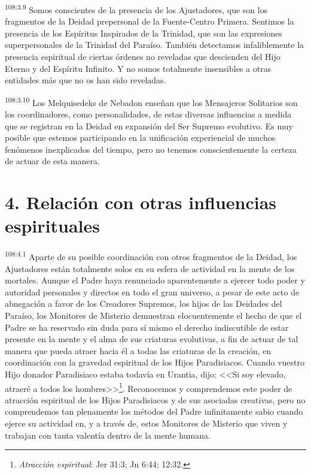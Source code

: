 \par
\textsuperscript{108:3.9} Somos conscientes de la presencia de los Ajustadores, que son los fragmentos de la Deidad prepersonal de la Fuente-Centro Primera. Sentimos la presencia de los Espíritus Inspirados de la Trinidad, que son las expresiones superpersonales de la Trinidad del Paraíso. También detectamos infaliblemente la presencia espiritual de ciertas órdenes no reveladas que descienden del Hijo Eterno y del Espíritu Infinito. Y no somos totalmente insensibles a otras entidades más que no os han sido reveladas.

\par
\textsuperscript{108:3.10} Los Melquisedeks de Nebadon enseñan que los Mensajeros Solitarios son los coordinadores, como personalidades, de estas diversas influencias a medida que se registran en la Deidad en expansión del Ser Supremo evolutivo. Es muy posible que estemos participando en la unificación experiencial de muchos fenómenos inexplicados del tiempo, pero no tenemos conscientemente la certeza de actuar de esta manera.

\section*{4. Relación con otras influencias espirituales}
\par
\textsuperscript{108:4.1} Aparte de su posible coordinación con otros fragmentos de la Deidad, los Ajustadores están totalmente solos en su esfera de actividad en la mente de los mortales. Aunque el Padre haya renunciado aparentemente a ejercer todo poder y autoridad personales y directos en todo el gran universo, a pesar de este acto de abnegación a favor de los Creadores Supremos, los hijos de las Deidades del Paraíso, los Monitores de Misterio demuestran elocuentemente el hecho de que el Padre se ha reservado sin duda para sí mismo el derecho indiscutible de estar presente en la mente y el alma de sus criaturas evolutivas, a fin de actuar de tal manera que pueda atraer hacia él a todas las criaturas de la creación, en coordinación con la gravedad espiritual de los Hijos Paradisiacos. Cuando vuestro Hijo donador Paradisiaco estaba todavía en Urantia, dijo: <<Si soy elevado, atraeré a todos los hombres>>\footnote{\textit{Atracción espiritual}: Jer 31:3; Jn 6:44; 12:32.}. Reconocemos y comprendemos este poder de atracción espiritual de los Hijos Paradisiacos y de sus asociadas creativas, pero no comprendemos tan plenamente los métodos del Padre infinitamente sabio cuando ejerce su actividad en, y a través de, estos Monitores de Misterio que viven y trabajan con tanta valentía dentro de la mente humana.

